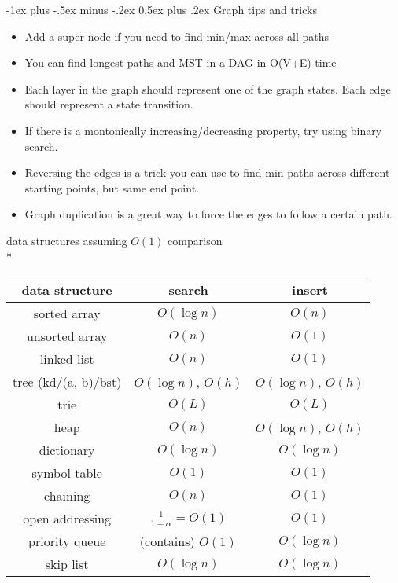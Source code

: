 \documentclass[10pt, landscape]{article}
\makeatletter
\newenvironment{tightcenter}{%
  \setlength\topsep{0pt}
  \setlength\parskip{0pt}
  \begin{center}
}{%
  \end{center}
}
\renewcommand{\section}{\@startsection{section}{1}{0mm}%
                                {-1ex plus -.5ex minus -.2ex}%
                                {0.5ex plus .2ex}%
                                {\normalfont\large\bfseries}}
\makeatother
\begin{document}
\begin{multicols}{4}
\section{Graph tips and tricks}
\begin{itemize}
    \item Add a super node if you need to find min/max across all paths
    \item You can find longest paths and MST in a DAG in O(V+E) time
    \item Each layer in the graph should represent one of the graph states. Each edge should represent a state transition.
    \item If there is a montonically increasing/decreasing property, try using binary search.
    \item Reversing the edges is a trick you can use to find min paths across different starting points, but same end point.
    \item Graph duplication is a great way to force the edges to follow a certain path.
\end{itemize}

\begin{tightcenter}
    data structures assuming $O(1)$ comparison 
\\* \begin{tabular}{| c | c | c |}\hline
    \textbf{data structure} & \textbf{search} & \textbf{insert}\\\hline
    sorted array & $O(\log n)$ & $O(n)$ \\\hline
    unsorted array & $O(n)$ & $O(1)$ \\\hline
    linked list & $O(n)$ & $O(1)$ \\\hline
    tree (kd/(a, b)/bst) & $O(\log n)$, $O(h)$ & $O(\log n)$, $O(h)$ \\\hline
    trie & $O(L)$ & $O(L)$ \\\hline
    heap & $O(n)$ & $O(\log n)$, $O(h)$ \\\hline
    dictionary & $O(\log n)$ & $O(\log n)$ \\\hline
    symbol table & $O(1)$ & $O(1)$ \\\hline
    chaining & $O(n)$ & $O(1)$ \\\hline
    open addressing & $\frac{1}{1-\alpha} = O(1)$ & $O(1)$ \\\hline
    priority queue & (contains) $O(1)$ & $O(\log n)$ \\\hline
    skip list & $O(\log n)$ & $O(\log n)$ \\\hline
\end{tabular}


\end{tightcenter}
\end{multicols}
\end{document}
